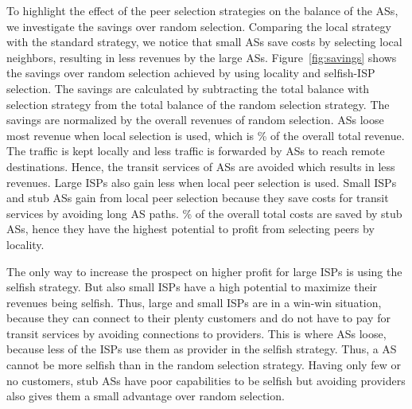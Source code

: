 To highlight the effect of the peer selection strategies on the balance of the ASs, we investigate the savings over random selection.
Comparing the local strategy with the standard strategy, we notice that small ASs save costs by selecting local neighbors, resulting in less revenues by the large ASs.
Figure~\ref{fig:savings} shows the savings over random selection achieved by using locality and selfish-ISP selection. The savings are calculated by subtracting the total balance with selection strategy from the total balance of the random selection strategy. The savings are normalized by the overall revenues of random selection. \tier ASs loose most revenue when local selection is used, which is \unit[10]{\%} of the overall total revenue. The traffic is kept locally and less traffic is forwarded by \tier ASs to reach remote destinations. Hence, the transit services of \tier ASs are avoided which results in less revenues. Large ISPs also gain less when local peer selection is used. Small ISPs and stub ASs gain from local peer selection because they save costs for transit services by avoiding long AS paths. \unit[10]{\%} of the overall total costs are saved by stub ASs, hence they have the highest potential to profit from selecting peers by locality.



The only way to increase the prospect on higher profit for large ISPs is using the selfish strategy. But also small ISPs have a high potential to maximize their revenues being selfish. Thus, large and small ISPs are in a win-win situation, because they can connect to their plenty customers and do not have to pay for transit services by avoiding connections to providers. This is where \tier ASs loose, because less of the ISPs use them as provider in the selfish strategy. Thus, a \tier AS cannot be more selfish than in the random selection strategy. Having only few or no customers, stub ASs have poor capabilities to be selfish but avoiding providers also gives them a small advantage over random selection.

